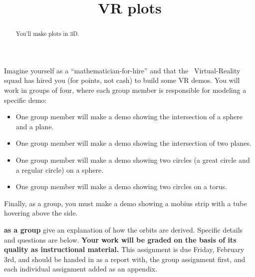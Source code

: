 \documentclass{ximera}
\title{VR plots}
\begin{document}
\begin{abstract}
  You'll make plots in 3D.
\end{abstract}
\maketitle

Imagine yourself as a ``mathematician-for-hire'' and that the
\mooculus\ Virtual-Reality squad has hired you (for points, not cash)
to build some VR demos. You will work in groups of four, where each
group member is responsible for modeling a specific demo:
\begin{itemize}
\item One group member will make a demo showing the intersection of a
  sphere and a plane.
\item One group member will make a demo showing the intersection of
  two planes.
\item One group member will make a demo showing two circles (a great
  circle and a regular circle) on a sphere.
\item One group member will make a demo showing two circles on a
  torus.
\end{itemize}
Finally, as a group, you must make a demo showing a mobius strip with
a tube hovering above the side.







\textbf{as a group} give an explanation of how
the orbits are derived. Specific details and questions are below.
\textbf{Your work will be graded on the basis of its quality as instructional
material.}  This assignment is due Friday, February 3rd, and should be
handed in as a report with, the group assignment first, and each
individual assignment added as an appendix.
\end{document}
